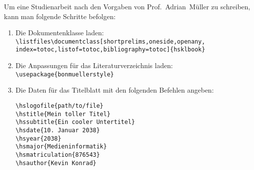 
Um eine Studienarbeit nach den Vorgaben von Prof.~Adrian~Müller zu schreiben,
kann man folgende Schritte befolgen:

\begin{enumerate}
	\item Die Dokumentenklasse laden:\\
		\verb!\listfiles\documentclass[shortprelims,oneside,openany,!\\
		\verb!index=totoc,listof=totoc,bibliography=totoc]{hsklbook}!
	\item Die Anpassungen für das Literaturverzeichnis laden:\\
		\verb!\usepackage{bonmuellerstyle}!
	\item Die Daten für das Titelblatt mit den folgenden Befehlen angeben:\\
		\begin{minipage}{\textwidth}
			\begin{multicols}{2}
				\verb!\hslogofile{path/to/file}!\\
				\verb!\hstitle{Mein toller Titel}!\\
				\verb!\hssubtitle{Ein cooler Untertitel}!\\
				\verb!\hsdate{10. Januar 2038}!\\
				\verb!\hsyear{2038}!\\
				\verb!\hsmajor{Medieninformatik}!\\
				\verb!\hsmatriculation{876543}!\\
				\verb!\hsauthor{Kevin Konrad}!
			\end{multicols}
		\end{minipage}


\end{enumerate}
